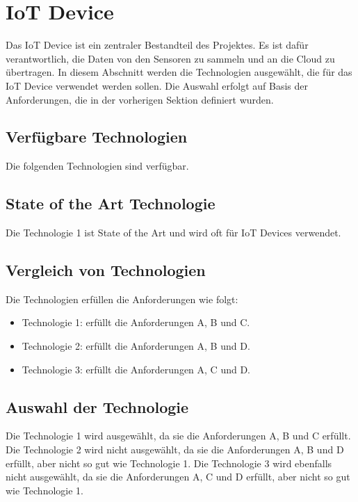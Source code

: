 \section{IoT Device}
Das IoT Device ist ein zentraler Bestandteil des Projektes. Es ist dafür verantwortlich, die Daten von den Sensoren zu sammeln und an die Cloud zu übertragen. In diesem Abschnitt werden die Technologien ausgewählt, die für das IoT Device verwendet werden sollen. Die Auswahl erfolgt auf Basis der Anforderungen, die in der vorherigen Sektion definiert wurden.
\subsection{Verfügbare Technologien}
Die folgenden Technologien sind verfügbar.
\subsection{State of the Art Technologie}
Die Technologie 1 ist State of the Art und wird oft für IoT Devices verwendet.
\subsection{Vergleich von Technologien}
Die Technologien erfüllen die Anforderungen wie folgt:
\begin{itemize}
    \item Technologie 1: erfüllt die Anforderungen A, B und C.
    \item Technologie 2: erfüllt die Anforderungen A, B und D.
    \item Technologie 3: erfüllt die Anforderungen A, C und D.
\end{itemize}
\subsection{Auswahl der Technologie}
Die Technologie 1 wird ausgewählt, da sie die Anforderungen A, B und C erfüllt. Die Technologie 2 wird nicht ausgewählt, da sie die Anforderungen A, B und D erfüllt, aber nicht so gut wie Technologie 1. Die Technologie 3 wird ebenfalls nicht ausgewählt, da sie die Anforderungen A, C und D erfüllt, aber nicht so gut wie Technologie 1.
